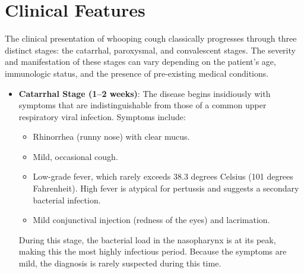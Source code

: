 \section*{Clinical Features}
The clinical presentation of whooping cough classically progresses through three distinct stages: the catarrhal, paroxysmal, and convalescent stages. The severity and manifestation of these stages can vary depending on the patient's age, immunologic status, and the presence of pre-existing medical conditions.
\begin{itemize}
    \item \textbf{Catarrhal Stage (1--2 weeks)}: The disease begins insidiously with symptoms that are indistinguishable from those of a common upper respiratory viral infection. Symptoms include:
    \begin{itemize}
        \item Rhinorrhea (runny nose) with clear mucus.
        \item Mild, occasional cough.
        \item Low-grade fever, which rarely exceeds 38.3 degrees Celsius (101 degrees Fahrenheit). High fever is atypical for pertussis and suggests a secondary bacterial infection.
        \item Mild conjunctival injection (redness of the eyes) and lacrimation.
    \end{itemize}
    During this stage, the bacterial load in the nasopharynx is at its peak, making this the most highly infectious period. Because the symptoms are mild, the diagnosis is rarely suspected during this time.


\end{itemize}
